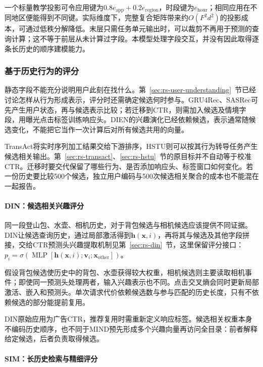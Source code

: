 一个标量教学投影可令应用键为$0.8e_{\mathrm{app}}+0.2e_{\mathrm{region}}$，时段键为$e_{\mathrm{hour}}$；相同应用在不同地区便能得到不同键。实际维度下，完整复合矩阵带来约$O(F^2d^2)$的投影成本，可通过低秩分解降低。末层只需任务单元输出时，可以裁剪不再用于预测的查询计算；这不等于前层从未计算过字段。本模型处理字段交互，并没有因此取得逐条长历史的顺序建模能力。

\subsubsection{基于历史行为的评分}
\label{sec:rs-history-scoring}

静态字段不能充分说明用户此刻在找什么。第~\ref{sec:rs-user-understanding}~节已经讨论怎样从行为形成表示，评分时还需确定候选何时参与。GRU4Rec、SASRec可先产生用户状态，再与候选表示比较；若迁移到CTR，则需加入候选及情境字段，用曝光点击标签训练响应头。DIEN的兴趣演化已经依赖候选，表示通常随候选变化，不能把它当作一次计算后对所有候选共用的向量。

TransAct将实时序列加工结果交给下游排序，HSTU则可以按其行为转导任务产生候选相关输出。第~\ref{sec:rs-transact}、\ref{sec:rs-hstu}~节的原目标并不自动等于校准CTR。迁移时要交代保留了哪些行为、是否添加响应头、标签窗口如何变化。若一份历史要比较500个候选，独立用户编码与500次候选相关聚合的成本也不能混在一起报告。

\paragraph{DIN：候选相关兴趣评分}
\label{sec:rs-din-scoring}

同一段登山包、水壶、相机历史，对于背包候选与相机候选应该提供不同证据。DIN让候选查询历史，通过局部激活得到$\bm h(\bm x,i)$，再将其与候选及其他字段拼接，交给CTR预测头兴趣提取机制见第~\ref{sec:rs-din}~节，这里保留评分接口：
$p_i=\sigma(\operatorname{MLP}[\bm h(\bm x,i);\bm v_i;\bm x_{\mathrm{other}}])$。

假设背包候选使历史中的背包、水壶获得较大权重，相机候选则主要读取相机事件；即使同一预测头处理两者，输入兴趣表示也不同。点击交叉熵会同时更新局部激活、嵌入和预测头。单次请求代价依赖候选数与参与匹配的历史长度，只有不依赖候选的部分能提前复用。

DIN原始应用为广告CTR，推荐复用时需重新定义响应标签。候选相关权重本身不编码历史顺序，也不同于MIND预先形成多个兴趣向量再访问全目录：前者解释给定候选，后者负责取得候选。

\Needspace{85mm}
\paragraph{SIM：长历史检索与精细评分}
\label{sec:rs-sim-scoring}

